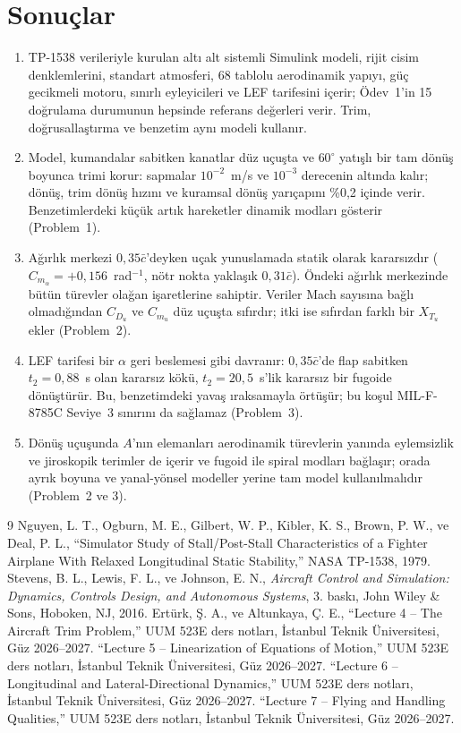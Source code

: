 \documentclass[conf]{new-aiaa}
\begin{document}
\section{Sonuçlar}
\begin{enumerate}
\item TP-1538 verileriyle kurulan altı alt sistemli Simulink modeli, rijit cisim denklemlerini, standart atmosferi, 68 tablolu aerodinamik yapıyı, güç gecikmeli motoru, sınırlı eyleyicileri ve LEF tarifesini içerir; Ödev~1'in 15 doğrulama durumunun hepsinde referans değerleri verir. Trim, doğrusallaştırma ve benzetim aynı modeli kullanır.
\item Model, kumandalar sabitken kanatlar düz uçuşta ve $60^\circ$ yatışlı bir tam dönüş boyunca trimi korur: sapmalar $10^{-2}$~m/s ve $10^{-3}$ derecenin altında kalır; dönüş, trim dönüş hızını ve kuramsal dönüş yarıçapını \%0,2 içinde verir. Benzetimlerdeki küçük artık hareketler dinamik modları gösterir (Problem~1).
\item Ağırlık merkezi $0,35\bar c$'deyken uçak yunuslamada statik olarak kararsızdır ($C_{m_\alpha}=+0,156$~rad$^{-1}$, nötr nokta yaklaşık $0,31\bar c$). Öndeki ağırlık merkezinde bütün türevler olağan işaretlerine sahiptir. Veriler Mach sayısına bağlı olmadığından $C_{D_u}$ ve $C_{m_u}$ düz uçuşta sıfırdır; itki ise sıfırdan farklı bir $X_{T_u}$ ekler (Problem~2).
\item LEF tarifesi bir $\alpha$ geri beslemesi gibi davranır: $0,35\bar c$'de flap sabitken $t_2=0,88$~s olan kararsız kökü, $t_2=20,5$~s'lik kararsız bir fugoide dönüştürür. Bu, benzetimdeki yavaş ıraksamayla örtüşür; bu koşul MIL-F-8785C Seviye~3 sınırını da sağlamaz (Problem~3).
\item Dönüş uçuşunda $A$'nın elemanları aerodinamik türevlerin yanında eylemsizlik ve jiroskopik terimler de içerir ve fugoid ile spiral modları bağlaşır; orada ayrık boyuna ve yanal-yönsel modeller yerine tam model kullanılmalıdır (Problem~2 ve 3).
\end{enumerate}

\begin{thebibliography}{9}
 Nguyen, L. T., Ogburn, M. E., Gilbert, W. P., Kibler, K. S., Brown, P. W., ve Deal, P. L., ``Simulator Study of Stall/Post-Stall Characteristics of a Fighter Airplane With Relaxed Longitudinal Static Stability,'' NASA TP-1538, 1979.
 Stevens, B. L., Lewis, F. L., ve Johnson, E. N., \emph{Aircraft Control and Simulation: Dynamics, Controls Design, and Autonomous Systems}, 3. baskı, John Wiley \& Sons, Hoboken, NJ, 2016.
 Ertürk, Ş. A., ve Altunkaya, Ç. E., ``Lecture 4 -- The Aircraft Trim Problem,'' UUM 523E ders notları, İstanbul Teknik Üniversitesi, Güz 2026--2027.
 ``Lecture 5 -- Linearization of Equations of Motion,'' UUM 523E ders notları, İstanbul Teknik Üniversitesi, Güz 2026--2027.
 ``Lecture 6 -- Longitudinal and Lateral-Directional Dynamics,'' UUM 523E ders notları, İstanbul Teknik Üniversitesi, Güz 2026--2027.
 ``Lecture 7 -- Flying and Handling Qualities,'' UUM 523E ders notları, İstanbul Teknik Üniversitesi, Güz 2026--2027.
\end{thebibliography}
\end{document}
